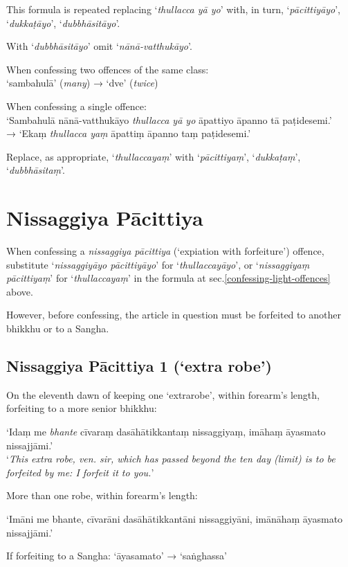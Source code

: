 This formula is repeated replacing ‘\emph{thullacca yā yo}’ with, in turn, ‘\emph{pācittiyāyo}’,
‘\emph{dukkaṭāyo}’, ‘\emph{dubbhāsitāyo}’.

With ‘\emph{dubbhāsitāyo}’ omit ‘\emph{nānā-vatthukāyo}’.

When confessing two offences of the same class:\\
‘sambahulā’ (\emph{many}) → ‘dve’ (\emph{twice})

When confessing a single offence:\\
‘Sambahulā nānā-vatthukāyo \emph{thullacca yā yo} āpattiyo āpanno tā paṭidesemi.’\\
→ ‘Ekaṃ \emph{thullacca yaṃ} āpattiṃ āpanno taṃ paṭidesemi.’

Replace, as appropriate, ‘\emph{thullaccayaṃ}’ with ‘\emph{pācittiyaṃ}’, ‘\emph{dukkaṭaṃ}’, ‘\emph{dubbhāsitaṃ}’.

\section{Nissaggiya Pācittiya}

When confessing a \emph{nissaggiya pācittiya} (‘expiation with forfeiture’)
offence, substitute ‘\emph{nissaggiyāyo pācittiyāyo}’ for
‘\emph{thullaccayāyo}’, or ‘\emph{nissaggiyaṃ pācittiyaṃ}’ for
‘\emph{thullaccayaṃ}’ in the formula at sec.\ref{confessing-light-offences}
above.

However, before confessing, the article in question must be forfeited to another
bhikkhu or to a Sangha. 

\subsection{Nissaggiya Pācittiya 1 (‘extra robe’)}
\label{np-1-extra-robe}

On the eleventh dawn of keeping one ‘extrarobe’, within forearm's length,
forfeiting to a more senior bhikkhu:

‘Idaṃ me \emph{bhante} cīvaraṃ dasāhātikkantaṃ nissaggiyaṃ, imāhaṃ āyasmato nissajjāmi.’\\
‘\emph{This extra robe, ven. sir, which has passed beyond the ten day (limit) is
  to be forfeited by me: I forfeit it to you.}’

More than one robe, within forearm's length:

‘Imāni me bhante, cīvarāni dasāhātikkantāni nissaggiyāni, imānāhaṃ āyasmato nissajjāmi.’

If forfeiting to a Sangha: ‘āyasamato’ → ‘saṅghassa’ 

